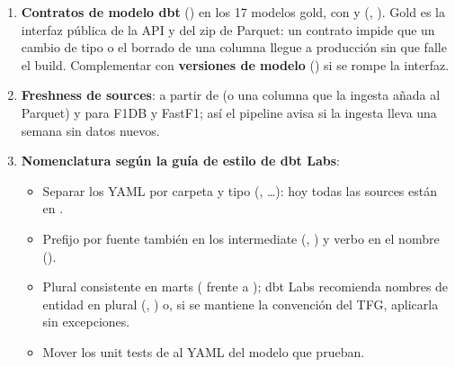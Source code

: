 \begin{enumerate}
\item \textbf{Contratos de modelo dbt} () en los 17 modelos gold, con  y  (, ). Gold es la interfaz pública de la API y del zip de Parquet: un contrato impide que un cambio de tipo o el borrado de una columna llegue a producción sin que falle el build. Complementar con \textbf{versiones de modelo} () si se rompe la interfaz.
\item \textbf{Freshness de sources}:  a partir de  (o una columna  que la ingesta añada al Parquet) y  para F1DB y FastF1; así el pipeline avisa si la ingesta lleva una semana sin datos nuevos.
\item \textbf{Nomenclatura según la guía de estilo de dbt Labs}:
\begin{itemize}
\item Separar los YAML por carpeta y tipo (, …): hoy todas las sources están en .
\item Prefijo por fuente también en los intermediate (, ) y verbo en el nombre ().
\item Plural consistente en marts ( frente a ); dbt Labs recomienda nombres de entidad en plural (, ) o, si se mantiene la convención del TFG, aplicarla sin excepciones.
\item Mover los unit tests de  al YAML del modelo que prueban.

\end{itemize}
\end{enumerate}
